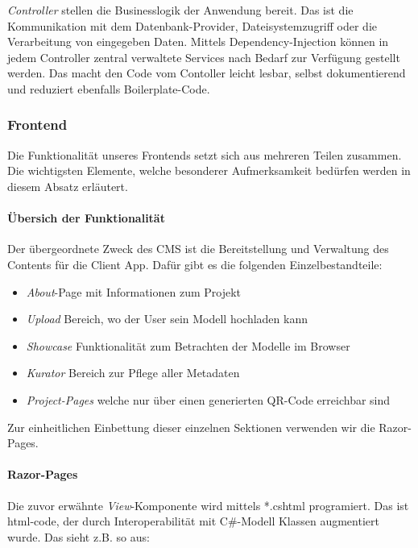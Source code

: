 \documentclass[titlepage, a4paper, 11pt]{scrartcl}
\begin{document}
        \textit{Controller} stellen die Businesslogik der Anwendung bereit. Das ist die Kommunikation mit dem Datenbank-Provider, Dateisystemzugriff oder die Verarbeitung von eingegeben Daten.
        Mittels Dependency-Injection können in jedem Controller zentral verwaltete Services nach Bedarf zur Verfügung gestellt werden. Das macht den Code vom Contoller leicht lesbar, selbst dokumentierend
        und reduziert ebenfalls Boilerplate-Code.

      \subsubsection{Frontend}

        Die Funktionalität unseres Frontends setzt sich aus mehreren Teilen zusammen. Die wichtigsten Elemente, welche besonderer Aufmerksamkeit bedürfen werden in diesem Absatz erläutert.

        \paragraph{Übersich der Funktionalität}

          Der übergeordnete Zweck des CMS ist die Bereitstellung und Verwaltung des Contents für die Client App. Dafür gibt es die folgenden Einzelbestandteile:

          \begin{itemize}
            \item \textit{About}-Page mit Informationen zum Projekt
            \item \textit{Upload} Bereich, wo der User sein Modell hochladen kann
            \item \textit{Showcase} Funktionalität zum Betrachten der Modelle im Browser
            \item \textit{Kurator} Bereich zur Pflege aller Metadaten
            \item \textit{Project-Pages} welche nur über einen generierten QR-Code erreichbar sind
          \end{itemize}
          
          Zur einheitlichen Einbettung dieser einzelnen Sektionen verwenden wir die Razor-Pages.

        \paragraph{Razor-Pages}

        Die zuvor erwähnte \textit{View}-Komponente wird mittels *.cshtml programiert. Das ist html-code, der durch Interoperabilität mit C\#-Modell Klassen augmentiert wurde.
        Das sieht z.B. so aus:
\end{document}
